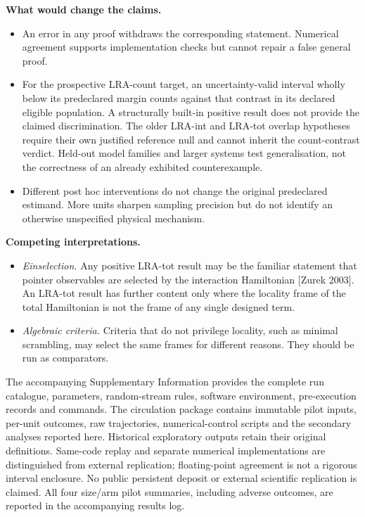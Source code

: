 \documentclass[
  10pt,
  a4paper,
]{article}
\makeatletter
\providecommand{\tightlist}{%
  \setlength{\itemsep}{0pt}\setlength{\parskip}{0pt}}
\renewcommand\section{\@startsection{section}{1}{\z@}{-2.4ex \@plus -1ex \@minus -.2ex}{1.2ex \@plus .2ex}{\normalfont\Large\bfseries}}
\makeatother
\begin{document}
\textbf{What would change the claims.}

\begin{itemize}
\tightlist
\item
  An error in any proof withdraws the corresponding statement. Numerical
  agreement supports implementation checks but cannot repair a false
  general proof.
\item
  For the prospective LRA-count target, an uncertainty-valid interval
  wholly below its predeclared margin counts against that contrast in
  its declared eligible population. A structurally built-in positive
  result does not provide the claimed discrimination. The older LRA-int
  and LRA-tot overlap hypotheses require their own justified reference
  null and cannot inherit the count-contrast verdict. Held-out model
  families and larger systems test generalisation, not the correctness
  of an already exhibited counterexample.
\item
  Different post hoc interventions do not change the original
  predeclared estimand. More units sharpen sampling precision but do not
  identify an otherwise unspecified physical mechanism.
\end{itemize}

\textbf{Competing interpretations.}

\begin{itemize}
\tightlist
\item
  \emph{Einselection.} Any positive LRA-tot result may be the familiar
  statement that pointer observables are selected by the interaction
  Hamiltonian {[}Zurek 2003{]}. An LRA-tot result has further content
  only where the locality frame of the total Hamiltonian is not the
  frame of any single designed term.
\item
  \emph{Algebraic criteria.} Criteria that do not privilege locality,
  such as minimal scrambling, may select the same frames for different
  reasons. They should be run as comparators.
\end{itemize}

\section{10. Data, code and
reproducibility}\label{data-code-and-reproducibility}

The accompanying Supplementary Information provides the complete run
catalogue, parameters, random-stream rules, software environment,
pre-execution records and commands. The circulation package contains
immutable pilot inputs, per-unit outcomes, raw trajectories,
numerical-control scripts and the secondary analyses reported here.
Historical exploratory outputs retain their original definitions.
Same-code replay and separate numerical implementations are
distinguished from external replication; floating-point agreement is not
a rigorous interval enclosure. No public persistent deposit or external
scientific replication is claimed. All four size/arm pilot summaries,
including adverse outcomes, are reported in the accompanying results
log.
\end{document}

